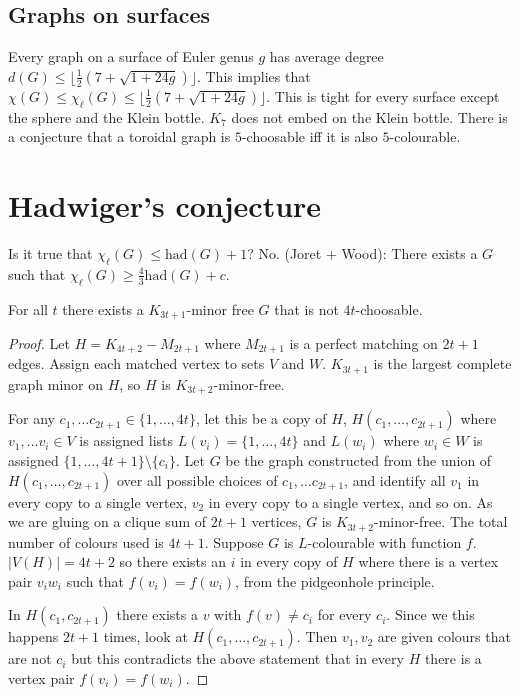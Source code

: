 \documentclass[]{article}
\newcommand{\had}{\text{had}}
\theoremstyle{definition}
\numberwithin{theorem}{section}
\numberwithin{equation}{section}
\begin{document}
\subsection{Graphs on surfaces}
Every graph on a surface of Euler genus $g$ has average degree $d(G) \leq \lfloor \frac{1}{2} (7 + \sqrt{1 + 24g}) \rfloor$. This implies that $\chi(G) \leq \chi_\ell(G) \leq \lfloor \frac{1}{2} (7 + \sqrt{1 + 24g}) \rfloor$. This is tight for every surface except the sphere and the Klein bottle. $K_7$ does not embed on the Klein bottle. There is a conjecture that a toroidal graph is $5$-choosable iff it is also $5$-colourable. 

\section{Hadwiger's conjecture}

Is it true that $\chi_\ell(G) \leq \had(G) + 1$? No. (Joret + Wood): There exists a $G$ such that $\chi_\ell(G) \geq \frac{4}{3} \had(G) + c$. 

For all $t$ there exists a $K_{3t + 1}$-minor free $G$ that is not $4t$-choosable. 

\begin{proof}
	Let $H = K_{4t + 2} - M_{2t + 1}$ where $M_{2t + 1}$ is a perfect matching on $2t + 1$ edges. Assign each matched vertex to sets $V$ and $W$. 
	$K_{3t + 1}$ is the largest complete graph minor on $H$, so $H$ is $K_{3t + 2}$-minor-free.
	
	For any $c_1, \ldots c_{2t + 1} \in \{1, \ldots, 4t\}$, let this be a copy of $H$, $H(c_1, \ldots, c_{2t + 1})$ where $v_1, \ldots v_i \in V$ is assigned lists $L(v_i) = \{1, \ldots, 4t\}$ and $L(w_i)$ where $w_i \in W$ is assigned $\{1, \ldots, 4t + 1\} \setminus \{c_i\}$. Let $G$ be the graph constructed from the union of $H(c_1, \ldots, c_{2t + 1})$ over all possible choices of $c_1, \ldots c_{2t + 1}$, and identify all $v_1$ in every copy to a single vertex, $v_2$ in every copy to a single vertex, and so on. As we are gluing on a clique sum of $2t + 1$ vertices, $G$ is $K_{3t + 2}$-minor-free. The total number of colours used is $4t + 1$. Suppose $G$ is $L$-colourable with function $f$. $|V(H)| = 4t + 2$ so there exists an $i$ in every copy of $H$ where there is a vertex pair $v_i w_i$ such that $f(v_i) = f(w_i)$, from the pidgeonhole principle. 
	
	In $H(c_1, c_{2t + 1})$ there exists a $v$ with $f(v) \neq c_i$ for every $c_i$. Since we this happens $2t + 1$ times, look at $H(c_1, \ldots, c_{2t + 1})$. Then $v_1, v_2$ are given colours that are not $c_i$ but this contradicts the above statement that in every $H$ there is a vertex pair $f(v_i) = f(w_i)$. 
\end{proof}
\end{document}
